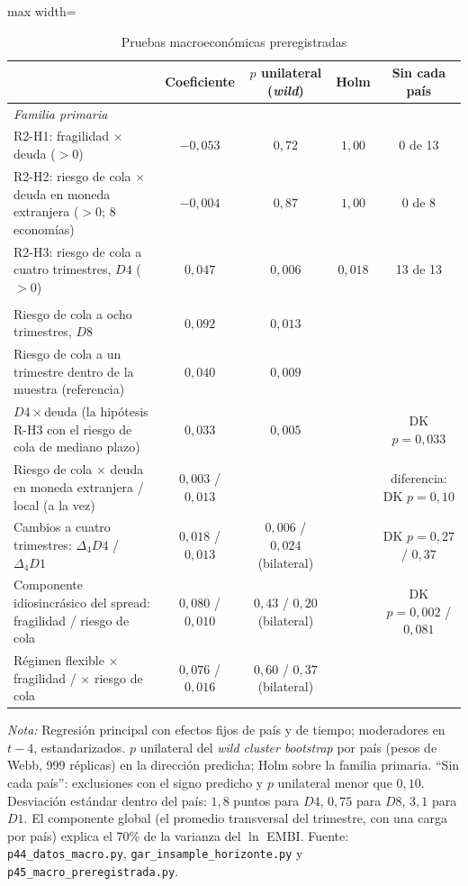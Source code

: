 \begin{table}[htbp]
\centering
\small
\caption[Pruebas macroeconómicas preregistradas]{Pruebas macroeconómicas preregistradas}
\label{tab:macro-prereg}
\begin{adjustbox}{max width=\linewidth}
\begin{tabular}{l c c c c}
\toprule
 & Coeficiente & $p$ unilateral (\textit{wild}) & Holm & Sin cada país \\
\midrule
\multicolumn{5}{l}{\textit{Familia primaria}} \\
\quad R2-H1: fragilidad $\times$ deuda ($>0$) & $-0{,}053$ & $0{,}72$ & $1{,}00$ & 0 de 13 \\
\quad R2-H2: riesgo de cola $\times$ deuda en moneda extranjera ($>0$; 8 economías) & $-0{,}004$ & $0{,}87$ & $1{,}00$ & 0 de 8 \\
\quad R2-H3: riesgo de cola a cuatro trimestres, $D4$ ($>0$) & $0{,}047$ & $0{,}006$ & $0{,}018$ & 13 de 13 \\
\addlinespace
\multicolumn{5}{l}{\textit{Secundarias}} \\
\quad Riesgo de cola a ocho trimestres, $D8$ & $0{,}092$ & $0{,}013$ & & \\
\quad Riesgo de cola a un trimestre dentro de la muestra (referencia) & $0{,}040$ & $0{,}009$ & & \\
\quad $D4\times$deuda (la hipótesis R-H3 con el riesgo de cola de mediano plazo) & $0{,}033$ & $0{,}005$ & & DK $p=0{,}033$ \\
\quad Riesgo de cola $\times$ deuda en moneda extranjera / local (a la vez) & $0{,}003$ / $0{,}013$ & & & diferencia: DK $p=0{,}10$ \\
\quad Cambios a cuatro trimestres: $\Delta_4 D4$ / $\Delta_4 D1$ & $0{,}018$ / $0{,}013$ & $0{,}006$ / $0{,}024$ (bilateral) & & DK $p=0{,}27$ / $0{,}37$ \\
\quad Componente idiosincrásico del spread: fragilidad / riesgo de cola & $0{,}080$ / $0{,}010$ & $0{,}43$ / $0{,}20$ (bilateral) & & DK $p=0{,}002$ / $0{,}081$ \\
\quad Régimen flexible $\times$ fragilidad / $\times$ riesgo de cola & $0{,}076$ / $0{,}016$ & $0{,}60$ / $0{,}37$ (bilateral) & & \\
\bottomrule
\end{tabular}
\end{adjustbox}
\par\smallskip\parbox{0.95\linewidth}{\footnotesize \textit{Nota:} Regresión principal con efectos fijos de país y de tiempo; moderadores en $t-4$, estandarizados. $p$ unilateral del \textit{wild cluster bootstrap} por país (pesos de Webb, 999 réplicas) en la dirección predicha; Holm sobre la familia primaria. ``Sin cada país'': exclusiones con el signo predicho y $p$ unilateral menor que $0{,}10$. Desviación estándar dentro del país: $1{,}8$ puntos para $D4$, $0{,}75$ para $D8$, $3{,}1$ para $D1$. El componente global (el promedio transversal del trimestre, con una carga por país) explica el 70\% de la varianza del $\ln$ EMBI. Fuente: \texttt{p44\_datos\_macro.py}, \texttt{gar\_insample\_horizonte.py} y \texttt{p45\_macro\_preregistrada.py}.}
\end{table}

